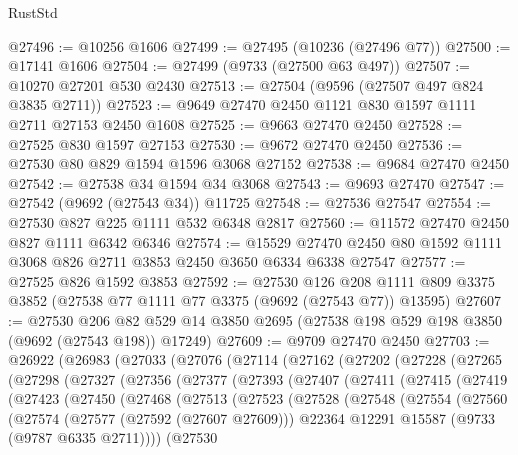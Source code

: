\begin{lexlean}{RustStd}
\begin{coremodule}
@27496 := @10256 @1606
@27499 := @27495 (@10236 (@27496 @77))
@27500 := @17141 @1606
@27504 := @27499 (@9733 (@27500 @63 @497))
@27507 := @10270 @27201 @530 @2430
@27513 := @27504 (@9596 (@27507 @497 @824 @3835 @2711))
@27523 := @9649 @27470 @2450 @1121 @830 @1597 @1111 @2711 @27153 @2450 @1608
@27525 := @9663 @27470 @2450
@27528 := @27525 @830 @1597 @27153
@27530 := @9672 @27470 @2450
@27536 := @27530 @80 @829 @1594 @1596 @3068 @27152
@27538 := @9684 @27470 @2450
@27542 := @27538 @34 @1594 @34 @3068
@27543 := @9693 @27470
@27547 := @27542 (@9692 (@27543 @34)) @11725
@27548 := @27536 @27547
@27554 := @27530 @827 @225 @1111 @532 @6348 @2817
@27560 := @11572 @27470 @2450 @827 @1111 @6342 @6346
@27574 := @15529 @27470 @2450 @80 @1592 @1111 @3068 @826 @2711 @3853 @2450 @3650 @6334 @6338 @27547
@27577 := @27525 @826 @1592 @3853
@27592 := @27530
    @126
    @208
    @1111
    @809
    @3375
    @3852
    (@27538 @77 @1111 @77 @3375 (@9692 (@27543 @77)) @13595)
@27607 := @27530
    @206
    @82
    @529
    @14
    @3850
    @2695
    (@27538 @198 @529 @198 @3850 (@9692 (@27543 @198)) @17249)
@27609 := @9709 @27470 @2450
@27703 := @26922
    (@26983
      (@27033
        (@27076
          (@27114
            (@27162
              (@27202
                (@27228
                  (@27265
                    (@27298
                      (@27327
                        (@27356
                          (@27377
                            (@27393
                              (@27407
                                (@27411
                                  (@27415
                                    (@27419
                                      (@27423
                                        (@27450
                                          (@27468
                                            (@27513
                                              (@27523
                                                (@27528
                                                  (@27548
                                                    (@27554
                                                      (@27560
                                                        (@27574
                                                          (@27577 (@27592 (@27607 @27609)))
                                                          @22364
                                                          @12291
                                                          @15587
                                                          (@9733 (@9787 @6335 @2711))))
                                                      (@27530

\end{coremodule}
\end{lexlean}
